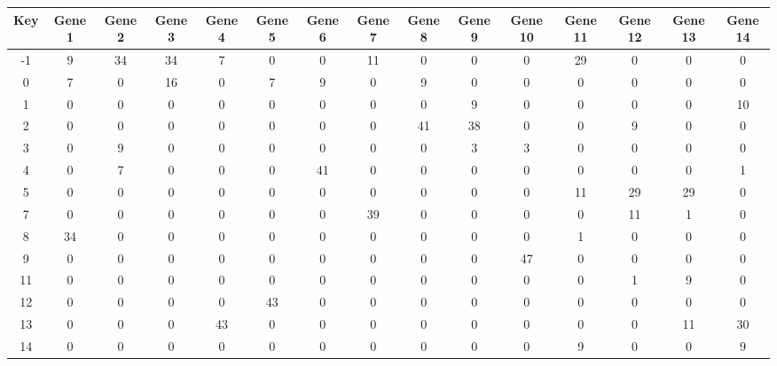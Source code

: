 \begin{tabular}{|c|c|c|c|c|c|c|c|c|c|c|c|c|c|c|}
\hline
Key & Gene 1 & Gene 2 & Gene 3 & Gene 4 & Gene 5 & Gene 6 & Gene 7 & Gene 8 & Gene 9 & Gene 10 & Gene 11 & Gene 12 & Gene 13 & Gene 14 \\
\hline
-1 & 9 & 34 & 34 & 7 & 0 & 0 & 11 & 0 & 0 & 0 & 29 & 0 & 0 & 0 \\
0 & 7 & 0 & 16 & 0 & 7 & 9 & 0 & 9 & 0 & 0 & 0 & 0 & 0 & 0 \\
1 & 0 & 0 & 0 & 0 & 0 & 0 & 0 & 0 & 9 & 0 & 0 & 0 & 0 & 10 \\
2 & 0 & 0 & 0 & 0 & 0 & 0 & 0 & 41 & 38 & 0 & 0 & 9 & 0 & 0 \\
3 & 0 & 9 & 0 & 0 & 0 & 0 & 0 & 0 & 3 & 3 & 0 & 0 & 0 & 0 \\
4 & 0 & 7 & 0 & 0 & 0 & 41 & 0 & 0 & 0 & 0 & 0 & 0 & 0 & 1 \\
5 & 0 & 0 & 0 & 0 & 0 & 0 & 0 & 0 & 0 & 0 & 11 & 29 & 29 & 0 \\
7 & 0 & 0 & 0 & 0 & 0 & 0 & 39 & 0 & 0 & 0 & 0 & 11 & 1 & 0 \\
8 & 34 & 0 & 0 & 0 & 0 & 0 & 0 & 0 & 0 & 0 & 1 & 0 & 0 & 0 \\
9 & 0 & 0 & 0 & 0 & 0 & 0 & 0 & 0 & 0 & 47 & 0 & 0 & 0 & 0 \\
11 & 0 & 0 & 0 & 0 & 0 & 0 & 0 & 0 & 0 & 0 & 0 & 1 & 9 & 0 \\
12 & 0 & 0 & 0 & 0 & 43 & 0 & 0 & 0 & 0 & 0 & 0 & 0 & 0 & 0 \\
13 & 0 & 0 & 0 & 43 & 0 & 0 & 0 & 0 & 0 & 0 & 0 & 0 & 11 & 30 \\
14 & 0 & 0 & 0 & 0 & 0 & 0 & 0 & 0 & 0 & 0 & 9 & 0 & 0 & 9 \\
\hline
\end{tabular}